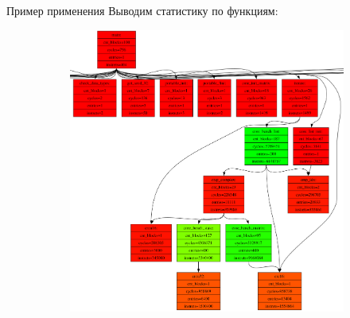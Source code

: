 \documentclass[10pt,aspectratio=169,hyperref={pdftex,unicode},xcolor=dvipsnames]{beamer}
\begin{document}
\begin{frame}{ Пример применения }
    Выводим статистику по функциям:
    \begin{figure}
        \begin{subfigure}{0.45\textwidth}
            \centering
            \includegraphics[height=0.8\textheight,keepaspectratio]{./images/stacd_functions.png}
        \end{subfigure}
        \begin{subfigure}{0.45\textwidth}
            \centering
\end{subfigure}
\end{figure}
\end{frame}
\end{document}
